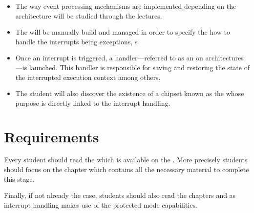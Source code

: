 \begin{itemize}
  \item

    \-

    The way event processing mechanisms are implemented depending on the
    architecture will be studied through the lectures.
  \item

    \-

    The  will be manually build and managed in order to specify
    the  how to handle the interrupts being exceptions,
    s \etc{}
  \item

    \-

    Once an interrupt is triggered, a handler---referred to as an 
    on  architectures---is launched. This handler is responsible
    for saving and restoring the state of the interrupted execution context
    among others.
  \item

    \-

    The student will also discover the existence of a chipset known as the
     whose purpose is directly linked to the interrupt handling.
\end{itemize}

\newpage

%
%

%
%

\section{Requirements}

Every student should read the  which
is available on the . More precisely students should focus
on the chapter  which contains
all the necessary material to complete this stage.

Finally, if not already the case, students should also read the chapters
 and  as interrupt
handling makes use of the protected mode capabilities.

